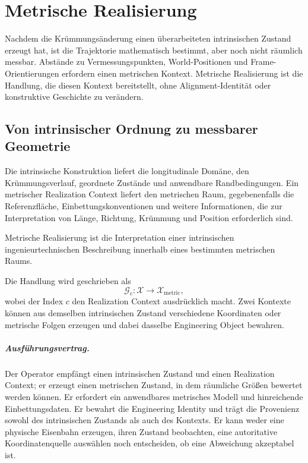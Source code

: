 
\chapter{Metrische Realisierung}
\label{chap:metric-realization}

Nachdem die Krümmungsänderung einen überarbeiteten intrinsischen Zustand
erzeugt hat, ist die Trajektorie mathematisch bestimmt, aber noch nicht
räumlich messbar. Abstände zu Vermessungspunkten, World-Positionen und
Frame-Orientierungen erfordern einen metrischen Kontext. Metrische
Realisierung ist die Handlung, die diesen Kontext bereitstellt, ohne
Alignment-Identität oder konstruktive Geschichte zu verändern.

\section{Von intrinsischer Ordnung zu messbarer Geometrie}

Die intrinsische Konstruktion liefert die longitudinale Domäne, den
Krümmungsverlauf, geordnete Zustände und anwendbare Randbedingungen. Ein
metrischer Realization Context liefert den metrischen Raum, gegebenenfalls die
Referenzfläche, Einbettungskonventionen und weitere Informationen, die zur
Interpretation von Länge, Richtung, Krümmung und Position erforderlich sind.

\begin{definition}
Metrische Realisierung ist die Interpretation einer intrinsischen
ingenieurtechnischen Beschreibung innerhalb eines bestimmten metrischen
Raums.
\end{definition}

Die Handlung wird geschrieben als
\[
\mathcal G_c:\mathcal X\rightarrow\mathcal X_{\mathrm{metric}},
\]
wobei der Index \(c\) den Realization Context ausdrücklich macht. Zwei
Kontexte können aus demselben intrinsischen Zustand verschiedene Koordinaten
oder metrische Folgen erzeugen und dabei dasselbe Engineering Object bewahren.

\paragraph{Ausführungsvertrag.}
Der Operator empfängt einen intrinsischen Zustand und einen Realization
Context; er erzeugt einen metrischen Zustand, in dem räumliche Größen bewertet
werden können. Er erfordert ein anwendbares metrisches Modell und hinreichende
Einbettungsdaten. Er bewahrt die Engineering Identity und trägt die Provenienz
sowohl des intrinsischen Zustands als auch des Kontexts. Er kann weder eine
physische Eisenbahn erzeugen, ihren Zustand beobachten, eine autoritative
Koordinatenquelle auswählen noch entscheiden, ob eine Abweichung akzeptabel
ist.

